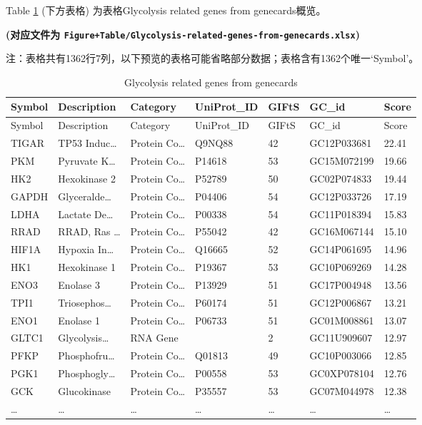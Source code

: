 \documentclass[
]{article}
\begin{document}
Table \ref{tab:Glycolysis-related-genes-from-genecards} (下方表格) 为表格Glycolysis related genes from genecards概览。

\textbf{(对应文件为 \texttt{Figure+Table/Glycolysis-related-genes-from-genecards.xlsx})}

\begin{center}\begin{tcolorbox}[colback=gray!10, colframe=gray!50, width=0.9\linewidth, arc=1mm, boxrule=0.5pt]注：表格共有1362行7列，以下预览的表格可能省略部分数据；表格含有1362个唯一`Symbol'。
\end{tcolorbox}
\end{center}

\begin{longtable}[]{@{}lllllll@{}}
\caption{\label{tab:Glycolysis-related-genes-from-genecards}Glycolysis related genes from genecards}\tabularnewline
\toprule
Symbol & Description & Category & UniProt\_ID & GIFtS & GC\_id & Score\tabularnewline
\midrule
\endfirsthead
\toprule
Symbol & Description & Category & UniProt\_ID & GIFtS & GC\_id & Score\tabularnewline
\midrule
\endhead
TIGAR & TP53 Induc\ldots{} & Protein Co\ldots{} & Q9NQ88 & 42 & GC12P033681 & 22.41\tabularnewline
PKM & Pyruvate K\ldots{} & Protein Co\ldots{} & P14618 & 53 & GC15M072199 & 19.66\tabularnewline
HK2 & Hexokinase 2 & Protein Co\ldots{} & P52789 & 50 & GC02P074833 & 19.44\tabularnewline
GAPDH & Glyceralde\ldots{} & Protein Co\ldots{} & P04406 & 54 & GC12P033726 & 17.19\tabularnewline
LDHA & Lactate De\ldots{} & Protein Co\ldots{} & P00338 & 54 & GC11P018394 & 15.83\tabularnewline
RRAD & RRAD, Ras \ldots{} & Protein Co\ldots{} & P55042 & 42 & GC16M067144 & 15.10\tabularnewline
HIF1A & Hypoxia In\ldots{} & Protein Co\ldots{} & Q16665 & 52 & GC14P061695 & 14.96\tabularnewline
HK1 & Hexokinase 1 & Protein Co\ldots{} & P19367 & 53 & GC10P069269 & 14.28\tabularnewline
ENO3 & Enolase 3 & Protein Co\ldots{} & P13929 & 51 & GC17P004948 & 13.56\tabularnewline
TPI1 & Triosephos\ldots{} & Protein Co\ldots{} & P60174 & 51 & GC12P006867 & 13.21\tabularnewline
ENO1 & Enolase 1 & Protein Co\ldots{} & P06733 & 51 & GC01M008861 & 13.07\tabularnewline
GLTC1 & Glycolysis\ldots{} & RNA Gene & & 2 & GC11U909607 & 12.97\tabularnewline
PFKP & Phosphofru\ldots{} & Protein Co\ldots{} & Q01813 & 49 & GC10P003066 & 12.85\tabularnewline
PGK1 & Phosphogly\ldots{} & Protein Co\ldots{} & P00558 & 53 & GC0XP078104 & 12.76\tabularnewline
GCK & Glucokinase & Protein Co\ldots{} & P35557 & 53 & GC07M044978 & 12.38\tabularnewline
\ldots{} & \ldots{} & \ldots{} & \ldots{} & \ldots{} & \ldots{} & \ldots{}\tabularnewline
\bottomrule
\end{longtable}
\end{document}
